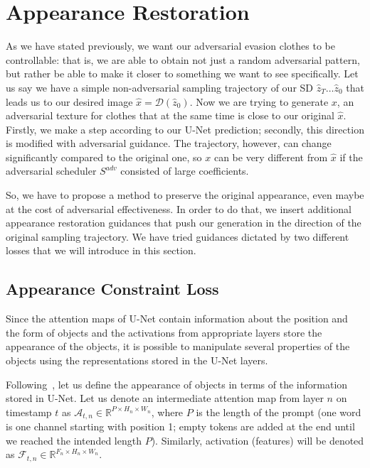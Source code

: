\section{Appearance Restoration}

As we have stated previously, we want our adversarial evasion clothes to be controllable: that is, we are able to obtain not just a random adversarial pattern, but rather be able to make it closer to something we want to see specifically.
Let us say we have a simple non-adversarial sampling trajectory of our SD $\hat{z}_T\ldots\hat{z}_0$ that leads us to our desired image $\hat{x} = \mathcal{D}(\hat{z}_0)$.
Now we are trying to generate $x$, an adversarial texture for clothes that at the same time is close to our original $\hat{x}$.
Firstly, we make a step according to our U-Net prediction; secondly, this direction is modified with adversarial guidance. 
The trajectory, however, can change significantly compared to the original one, so $x$ can be very different from $\hat{x}$ if the adversarial scheduler $S^{adv}$ consisted of large coefficients.

So, we have to propose a method to preserve the original appearance, even maybe at the cost of adversarial effectiveness. 
In order to do that, we insert additional appearance restoration guidances that push our generation in the direction of the original sampling trajectory.
We have tried guidances dictated by two different losses that we will introduce in this section.

\subsection{Appearance Constraint Loss}

Since the attention maps of U-Net contain information about the position and the form of objects and the activations from appropriate layers store the appearance of the objects, it is possible to manipulate several properties of the objects using the representations stored in the U-Net layers.

Following~\cite{aibek}, let us define the appearance of objects in terms of the information stored in U-Net.
Let us denote an intermediate attention map from layer $n$ on timestamp $t$ as $\mathcal{A}_{t,n} \in \mathbb{R}^{P \times H_n\times W_n}$, where $P$ is the length of the prompt (one word is one channel starting with position 1; empty tokens are added at the end until we reached the intended length $P$).
Similarly, activation (features) will be denoted as $\mathcal{F}_{t,n}\in \mathbb{R}^{F_n\times H_n\times W_n}$.

